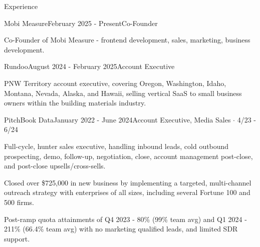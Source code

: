 \documentclass[
	11pt, %
]{resume} %
\begin{document}




\begin{rSection}{Experience}

    \begin{rSubsection}{Mobi Measure}{February 2025 - Present\smallskip}{Co-Founder}{}
        \item Co-Founder of Mobi Measure - frontend development, sales, marketing, business development.
    \end{rSubsection}

    \begin{rSubsection}{Rundoo}{August 2024 - February 2025\smallskip}{Account Executive}{}
        \item PNW Territory account executive, covering Oregon, Washington, Idaho, Montana, Nevada, Alaska, and Hawaii, selling vertical SaaS to small business owners within the building materials industry.
    \end{rSubsection}

    \begin{rSubsection}{PitchBook Data}{January 2022 - June 2024\smallskip}{Account Executive, Media Sales $\cdot$ 4/23 - 6/24}{}
        \smallskip
		\item Full-cycle, hunter sales executive, handling inbound leads, cold outbound prospecting, demo, follow-up, negotiation, close, account management post-close, and post-close upsells/cross-sells.
            \item Closed over \$725,000 in new business by implementing a targeted, multi-channel outreach strategy with enterprises of all sizes, including several Fortune 100 and 500 firms.
            \item Post-ramp quota attainments of Q4 2023 - 80\% (99\% team avg) and Q1 2024 - 211\% (66.4\% team avg) with no marketing qualified leads, and limited SDR support.
		

\end{rSubsection}
\end{rSection}
\end{document}
